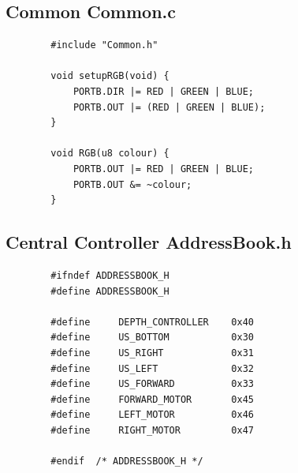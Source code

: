 \documentclass[11pt,a4paper,titlepage]{report}
\begin{document}
	\subsection{Common Common.c}\label{appendix:final_code_common_c}
	\begin{lstlisting}
		#include "Common.h"
		
		void setupRGB(void) {
			PORTB.DIR |= RED | GREEN | BLUE;
			PORTB.OUT |= (RED | GREEN | BLUE);
		}
		
		void RGB(u8 colour) {
			PORTB.OUT |= RED | GREEN | BLUE;
			PORTB.OUT &= ~colour;
		}
	\end{lstlisting}
	
	\subsection{Central Controller AddressBook.h}\label{appendix:final_code_address_book_h}
	\begin{lstlisting}
		#ifndef ADDRESSBOOK_H
		#define	ADDRESSBOOK_H
		
		#define     DEPTH_CONTROLLER    0x40
		#define     US_BOTTOM           0x30
		#define     US_RIGHT            0x31
		#define     US_LEFT             0x32
		#define     US_FORWARD          0x33
		#define     FORWARD_MOTOR       0x45
		#define     LEFT_MOTOR          0x46
		#define     RIGHT_MOTOR         0x47
		
		#endif	/* ADDRESSBOOK_H */
	\end{lstlisting}
	
\end{document}
